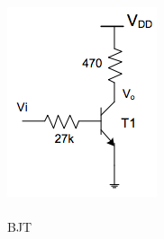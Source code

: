 \documentclass[pdftex,12pt,a4paper]{report}
\begin{document}
\begin{figure}[!htb]
  \includegraphics[width=\linewidth]{Imagens/BJT.png}
  \caption{\\BJT}\label{fig:fig_bjt}
\endminipage\hfill
{}

\end{figure}
\end{document}
